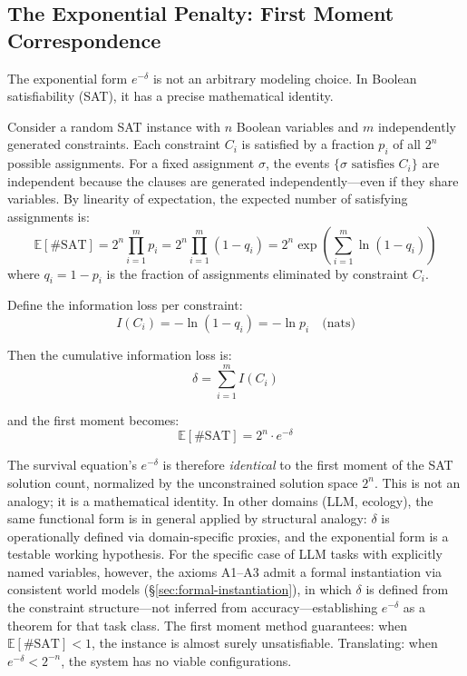 \documentclass[11pt,a4paper]{article}
\begin{document}
\subsection{The Exponential Penalty: First Moment Correspondence}
\label{sec:first-moment}

The exponential form $e^{-\delta}$ is not an arbitrary modeling choice. In Boolean satisfiability (SAT), it has a precise mathematical identity.

Consider a random SAT instance with $n$ Boolean variables and $m$ independently generated constraints. Each constraint $C_i$ is satisfied by a fraction $p_i$ of all $2^n$ possible assignments. For a fixed assignment $\sigma$, the events $\{\sigma \text{ satisfies } C_i\}$ are independent because the clauses are generated independently---even if they share variables. By linearity of expectation, the expected number of satisfying assignments is:
\begin{equation}
\mathbb{E}[\#\text{SAT}] = 2^n \prod_{i=1}^{m} p_i = 2^n \prod_{i=1}^{m} (1 - q_i) = 2^n \exp\!\left(\sum_{i=1}^{m} \ln(1 - q_i)\right)
\label{eq:first-moment}
\end{equation}
where $q_i = 1 - p_i$ is the fraction of assignments eliminated by constraint $C_i$.

Define the information loss per constraint:
\begin{equation}
I(C_i) = -\ln(1 - q_i) = -\ln p_i \quad \text{(nats)}
\label{eq:info-loss}
\end{equation}

Then the cumulative information loss is:
\begin{equation}
\delta = \sum_{i=1}^{m} I(C_i)
\label{eq:delta-def}
\end{equation}

and the first moment becomes:
\begin{equation}
\mathbb{E}[\#\text{SAT}] = 2^n \cdot e^{-\delta}
\label{eq:first-moment-exp}
\end{equation}

The survival equation's $e^{-\delta}$ is therefore \emph{identical} to the first moment of the SAT solution count, normalized by the unconstrained solution space $2^n$. This is not an analogy; it is a mathematical identity. In other domains (LLM, ecology), the same functional form is in general applied by structural analogy: $\delta$ is operationally defined via domain-specific proxies, and the exponential form is a testable working hypothesis. For the specific case of LLM tasks with explicitly named variables, however, the axioms A1--A3 admit a formal instantiation via consistent world models (\S\ref{sec:formal-instantiation}), in which $\delta$ is defined from the constraint structure---not inferred from accuracy---establishing $e^{-\delta}$ as a theorem for that task class. The first moment method \citep{alon2016} guarantees: when $\mathbb{E}[\#\text{SAT}] < 1$, the instance is almost surely unsatisfiable. Translating: when $e^{-\delta} < 2^{-n}$, the system has no viable configurations.
\end{document}
